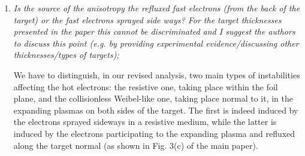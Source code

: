 \documentclass{article}
\begin{document}
\begin{enumerate}
\item \textit{Is the source of the anisotropy the refluxed fast electrons (from the back of the target) or the fast electrons sprayed side ways? For the target thicknesses presented in the paper this cannot be discriminated and I suggest the authors to discuss this point (e.g. by providing experimental evidence/discussing other thicknesses/types of targets); }

We have to distinguish, in our revised analysis, two main types of instabilities affecting the hot electrons: the resistive one, taking place within the foil plane, and the collisionless Weibel-like one, taking place normal to it, in the expanding plasmas on both sides of the target. The first is indeed induced by the electrons sprayed sideways in a resistive medium, while the latter is induced by the electrons participating to the expanding plasma and refluxed along the target normal (as shown in Fig. 3(c) of the main paper).

%
%


\end{enumerate}
\end{document}
